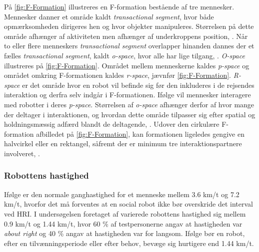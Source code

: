 På \autoref{fig:F-Formation} illustreres en F-formation bestående af tre mennesker. Mennesker danner et område kaldt \textit{transactional segment}, hvor både opmærksomheden dirigeres hen og hvor objekter manipuleres. Størrelsen på dette område afhænger af aktiviteten men afhænger af underkroppens position, \parencite[s. 446]{PDF:UsingFFormations}. Når to eller flere menneskers \textit{transactional segment} overlapper hinanden dannes der et fælles \textit{transactional segment}, kaldt \textit{o-space}, hvor alle har lige tilgang, \parencite[s. 446]{PDF:UsingFFormations}. \textit{O-space} illustreres på \autoref{fig:F-Formation}. Området mellem menneskerne kaldes \textit{p-space} og området omkring F-formationen kaldes \textit{r-space}, jævnfør \autoref{fig:F-Formation}. \textit{R-space} er det område hvor en robot vil befinde sig før den inkluderes i de rejsendes interaktion og derfra selv indgår i F-formationen. Ifølge \textcite[s. 41]{PDF:GroupVSIndividual} vil mennesker interagere med robotter i deres  \textit{p-space}. Størrelsen af \textit{o-space} afhænger derfor af hvor mange der deltager i interaktionen, og hvordan dette område tilpasser sig efter spatial og holdningsmæssig adfærd blandt de deltagende, \parencite[s. 446]{PDF:UsingFFormations}. Udover den cirkulære F-formation afbilledet på \autoref{fig:F-Formation}, kan formationen ligeledes gengive en halvcirkel eller en rektangel, såfremt der er minimum tre interaktionspartnere involveret, \parencite[s. 446]{PDF:UsingFFormations}.   
%

\subsubsection*{Robottens hastighed}
\label{InteraktionSocialeRobotterParametreBevaegelsesmoenstreHastighed}
%
Ifølge \textcite[s. 165]{PDF:HumanRobotEmodiedInteraction} er den normale ganghastighed for et menneske mellem 3.6 km/t og 7.2 km/t, hvorfor det må forventes at en social robot ikke bør overskride det interval ved HRI. I undersøgelsen foretaget af \textcite[s. 175]{PDF:HowMayIServeYou} varierede robottens hastighed sig mellem 0.9 km/t og 1.44 km/t, hvor 60 \% af testpersonerne angav at hastigheden var \textit{about right} og 40 \% angav at hastigheden var for langsom. Ifølge \textcite[s. 178]{PDF:HowMayIServeYou} bør en robot, efter en tilvænningsperiode eller efter behov, bevæge sig hurtigere end 1.44 km/t. 

